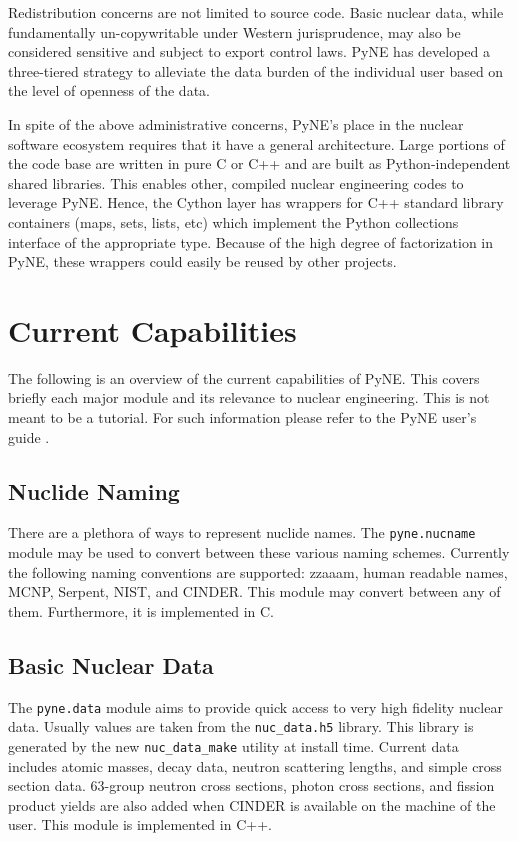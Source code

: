 \documentclass{anstrans}
\begin{document}
Redistribution concerns are not limited to source code.  Basic nuclear data,
while fundamentally un-copywritable under Western jurisprudence, may also be
considered sensitive and subject to export control laws.  PyNE has developed a
three-tiered strategy to alleviate the data burden of the individual user based
on the level of openness of the data.

In spite of the above administrative concerns, PyNE's place in the nuclear
software ecosystem requires that it have a general architecture.  Large portions
of the code base are written in pure C or C++ and are built as
Python-independent shared libraries.  This enables other, compiled nuclear
engineering codes to leverage PyNE.  Hence, the Cython layer has wrappers for
C++ standard library containers (maps, sets, lists, etc) which implement the
Python collections interface of the appropriate type.  Because of the high
degree of factorization in PyNE, these wrappers could easily be reused by other
projects.


\section{Current Capabilities}

The following is an overview of the current capabilities of PyNE.  This covers
briefly each major module and its relevance to nuclear engineering.  This is not
meant to be a tutorial.  For such information please refer to the PyNE user's
guide \cite{PyNE:2012}.

\subsection{Nuclide Naming} 
There are a plethora of ways to represent nuclide names.  The
\texttt{pyne.nucname} module may be used to convert between these various naming
schemes. Currently the following naming conventions are supported: zzaaam, human
readable names, MCNP, Serpent, NIST, and CINDER.  This module may convert
between any of them.  Furthermore, it is implemented in C.


\subsection{Basic Nuclear Data}
The \texttt{pyne.data} module aims to provide quick access to very high fidelity
nuclear data. Usually values are taken from the \texttt{nuc\_data.h5} library.
This library is generated by the new \texttt{nuc\_data\_make} utility at install
time.  Current data includes atomic masses, decay data, neutron scattering
lengths, and simple cross section data. 63-group neutron cross sections, photon
cross sections, and fission product yields are also added when CINDER is
available on the machine of the user.  This module is implemented in C++.
\end{document}
